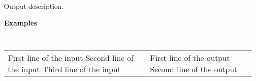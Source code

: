 \documentclass{article}
\newenvironment{EnglishTestCases}
{
	\vspace{-4mm}
	\begingroup
	\tt
	\renewcommand{\arraystretch}{1.5} %
	\begin{longtable}{| p{85mm} | p{85mm} |}
		\hline
		{\sf {\bfseries Input}} & {\sf {\bfseries Output}} \\ \hline
		\endfirsthead
}
{
	\end{longtable}
	\endgroup
}
\newcommand{\printSubtitle}[1]{
	\vspace{1mm}
	\begin{flushleft} {\Large \sf \bfseries #1 \newline} \end{flushleft}
	\vspace{-4mm}
}
\newcommand{\addTest}[2]{
	#1 %
	&
	#2 %
	\\
	\hline
}
\begin{document}
Output description.
\newline




\printSubtitle{Examples}

\begin{EnglishTestCases}
	\addTest{
		First line of the input \newline
		Second line of the input \newline
		Third line of the input
	}
	{
		First line of the output \newline
		Second line of the output
	}
\end{EnglishTestCases}
\end{document}

